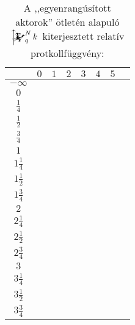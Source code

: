 \documentclass{article}
\newcommand{\blk}{\cellcolor{darkgray}}
\newcommand{\red}{\cellcolor{red!33}}
\newcommand{\grn}{\cellcolor{green!33}}
\newcommand{\nothing}{\text{\raisebox{0.4em}{\rotatebox{180}{$\curvearrowleft$}}}}%
\newcommand{\just}[1]{\boxed{#1}}%
\newcommand{\incl}{\mathbf{incl}}
\newcommand{\excl}{\mathbf{excl}}
\newcommand{\mainfunext}[3]{\left\uparrow\!\!\!\mathwitch*_{#2}^{#1}#3\right.}
\begin{document}
	\begin{table}[H]
		\caption*{A ,,egyenrangúsított aktorok'' ötletén alapuló $\mainfunext Nqk$ kiterjesztett relatív protkollfüggvény:}
		\centering
		\begin{tabular}{c||c|c|c|c|c|c|c|}
				&	$0$		&	$1$		&	$2$		&	$3$		&	$4$		&	$5$		\\\hline\hline
		$-\infty$	&	\nothing	&	\nothing	&	\nothing	&	\nothing	&	\nothing	&	\nothing	\\\hline
			$0$	&	\nothing	&	\nothing	&	\nothing	&	\nothing	&	\nothing	&	\grn\just\incl	\\\hline
		$\frac14$	&	\nothing	&	\nothing	&	\nothing	&	\nothing	&	\nothing	&	\grn\just\incl	\\\hline
		$\frac12$	&	\red\just\excl	&	\nothing	&	\nothing	&	\nothing	&	\nothing	&	\grn\just\incl	\\\hline
		$\frac34$	&	\red\just\excl	&	\nothing	&	\nothing	&	\nothing	&	\nothing	&	\grn\just\incl	\\\hline
			$1$	&	\red\just\excl	&	\nothing	&	\nothing	&	\nothing	&	\grn\just\incl	&	\blk		\\\hline
		$1\frac14$	&	\red\just\excl	&	\nothing	&	\nothing	&	\nothing	&	\grn\just\incl	&	\blk		\\\hline
		$1\frac12$	&	\blk		&	\red\just\excl	&	\nothing	&	\nothing	&	\grn\just\incl	&	\blk		\\\hline
		$1\frac34$	&	\blk		&	\red\just\excl	&	\nothing	&	\nothing	&	\grn\just\incl	&	\blk		\\\hline
			$2$	&	\blk		&	\red\just\excl	&	\nothing	&	\grn\just\incl	&	\blk		&	\blk		\\\hline
		$2\frac14$	&	\blk		&	\red\just\excl	&	\nothing	&	\grn\just\incl	&	\blk		&	\blk		\\\hline
		$2\frac12$	&	\blk		&	\blk		&	\red\just\excl	&	\grn\just\incl	&	\blk		&	\blk		\\\hline
		$2\frac34$	&	\blk		&	\blk		&	\red\just\excl	&	\grn\just\incl	&	\blk		&	\blk		\\\hline
			$3$	&	\blk		&	\blk		&	\blk		&	\blk		&	\blk		&	\blk		\\\hline
		$3\frac14$	&	\blk		&	\blk		&	\blk		&	\blk		&	\blk		&	\blk		\\\hline
		$3\frac12$	&	\blk		&	\blk		&	\blk		&	\blk		&	\blk		&	\blk		\\\hline
		$3\frac34$	&	\blk		&	\blk		&	\blk		&	\blk		&	\blk		&	\blk		\\\hline
		\end{tabular}
	\end{table}
\end{document}
